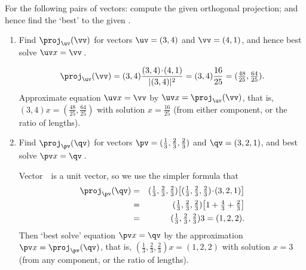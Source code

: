 \begin{example} \label{eg:projline}
For the following pairs of vectors: 
compute the given orthogonal projection; 
and hence find the `best'  to the given .
\begin{enumerate}
\item Find \(\proj_\uv(\vv)\) for vectors \(\uv=(3,4)\) and \(\vv=(4,1)\), and hence best solve \(\uv x=\vv\)\,.
\begin{solution} 
\begin{equation*}
\proj_\uv(\vv)=(3,4)\frac{(3,4)\cdot(4,1)}{|(3,4)|^2}
=(3,4)\frac{16}{25}
=(\tfrac{48}{25},\tfrac{64}{25}).
\end{equation*}
Approximate equation \(\uv x=\vv\) by \(\uv x=\proj_\uv(\vv)\), that is, \((3,4)x=(\tfrac{48}{25},\tfrac{64}{25})\) with solution \(x=\tfrac{16}{25}\) (from either component, or the ratio of lengths).
\end{solution}


\item Find \(\proj_\pv(\qv)\) for vectors \(\pv=(\tfrac13,\tfrac23,\tfrac23)\) and \(\qv=(3,2,1)\), and best solve \(\pv x=\qv\)\,.
\begin{solution} 
Vector~\pv\ is a unit vector, so we use the simpler formula that
\begin{eqnarray*}
\proj_\pv(\qv)&=& (\tfrac13,\tfrac23,\tfrac23)\big[(\tfrac13,\tfrac23,\tfrac23)\cdot(3,2,1)\big]
\\&=&(\tfrac13,\tfrac23,\tfrac23)\big[1+\tfrac43+\tfrac23\big] 
\\&=&(\tfrac13,\tfrac23,\tfrac23)3
=(1,2,2).
\end{eqnarray*}
Then `best solve' equation \(\pv x=\qv\) by the approximation \(\pv x=\proj_\pv(\qv)\), that is, \((\tfrac13,\tfrac23,\tfrac23)x=(1,2,2)\) with solution \(x=3\) (from any component, or the ratio of lengths).
\end{solution}
\end{enumerate}
\end{example}




